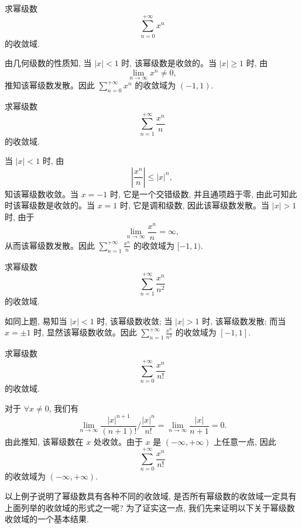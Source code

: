 \begin{example}\label{example:ma-11-1-2}
求幂级数
\[
  \sum_{n=0}^{+\infty}x^n
\]
的收敛域.
\end{example}


\begin{solve}
由几何级数的性质知, 当 $|x|<1$ 时, 该幂级数是收敛的。当 $|x|\geqslant1$ 时, 由
\[
  \lim_{n\to\infty}x^n\ne0,
\]
推知该幂级数发散。因此 $\sum_{n=0}^{+\infty}x^n$ 的收敛域为 $(-1,1)$.
\end{solve}


\begin{example}\label{example:ma-11-1-3}
求幂级数
\[
  \sum_{n=1}^{+\infty}\frac{x^n}{n}
\]
的收敛域.
\end{example}


\begin{solve}
当 $|x|<1$ 时, 由
\[
  \left|\frac{x^n}{n}\right|\leqslant |x|^n,
\]
知该幂级数收敛。当 $x=-1$ 时, 它是一个交错级数, 并且通项趋于零, 由此可知此时该幂级数是收敛的。当 $x=1$ 时, 它是调和级数, 因此该幂级数发散。当 $|x|>1$ 时, 由于
\[
  \lim_{n\to\infty}\frac{x^n}{n}=\infty,
\]
从而该幂级数发散。因此 $\sum_{n=1}^{+\infty}\frac{x^n}{n}$ 的收敛域为 $[-1,1)$.
\end{solve}


\begin{example}\label{example:ma-11-1-4}
求幂级数
\[
  \sum_{n=1}^{+\infty}\frac{x^n}{n^2}
\]
的收敛域.
\end{example}


\begin{solve}
如同上题, 易知当 $|x|<1$ 时, 该幂级数收敛; 当 $|x|>1$ 时, 该幂级数发散; 而当 $x=\pm1$ 时, 显然该幂级数收敛。因此 $\sum_{n=1}^{+\infty}\frac{x^n}{n^2}$ 的收敛域为 $[-1,1]$.
\end{solve}


\begin{example}\label{example:ma-11-1-5}
求幂级数
\[
  \sum_{n=0}^{+\infty}\frac{x^n}{n!}
\]
的收敛域.
\end{example}


\begin{solve}
对于 $\forall x\ne0$, 我们有
\[
  \lim_{n\to\infty}
  \frac{|x|^{n+1}}{(n+1)!}\Big/\frac{|x|^n}{n!}
  =
  \lim_{n\to\infty}\frac{|x|}{n+1}=0.
\]
由此推知, 该幂级数在 $x$ 处收敛。由于 $x$ 是 $(-\infty,+\infty)$ 上任意一点, 因此
\[
  \sum_{n=0}^{+\infty}\frac{x^n}{n!}
\]
的收敛域为 $(-\infty,+\infty)$.

以上例子说明了幂级数具有各种不同的收敛域, 是否所有幂级数的收敛域一定具有上面列举的收敛域的形式之一呢? 为了证实这一点, 我们先来证明以下关于幂级数收敛域的一个基本结果.
\end{solve}


